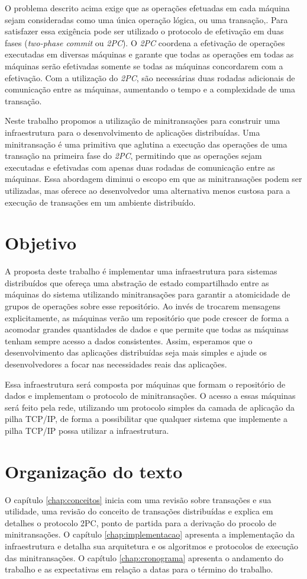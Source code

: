 \documentclass[11pt,twoside,a4paper]{book}
\begin{document}
O problema descrito acima exige que as operações efetuadas em cada máquina sejam consideradas como uma única operação lógica, ou uma transação,. Para satisfazer essa exigência pode ser utilizado o protocolo de efetivação em duas fases (\emph{two-phase commit} ou \emph{2PC}). O \emph{2PC} coordena a efetivação de operações executadas em diversas máquinas e garante que todas as operações em todas as máquinas serão efetivadas somente se todas as máquinas concordarem com a efetivação. Com a utilização do \emph{2PC}, são necessárias duas rodadas adicionais de comunicação entre as máquinas, aumentando o tempo e a complexidade de uma transação.

Neste trabalho propomos a utilização de minitransações para construir uma infraestrutura para o desenvolvimento de aplicações distribuídas. Uma minitransação é uma primitiva que aglutina a execução das operações de uma transação na primeira fase do \emph{2PC}, permitindo que as operações sejam executadas e efetivadas com apenas duas rodadas de comunicação entre as máquinas. Essa abordagem diminui o escopo em que as minitransações podem ser utilizadas, mas oferece ao desenvolvedor uma alternativa menos custosa para a execução de transações em um ambiente distribuído.

\section{Objetivo}
\label{sec:objetivo}
A proposta deste trabalho é implementar uma infraestrutura para sistemas distribuídos que ofereça uma abstração de estado compartilhado entre as máquinas do sistema utilizando minitransações para garantir a atomicidade de grupos de operações sobre esse repositório. Ao invés de trocarem mensagens explicitamente, as máquinas verão um repositório que pode crescer de forma a acomodar grandes quantidades de dados e que permite que todas as máquinas tenham sempre acesso a dados consistentes. Assim, esperamos que o desenvolvimento das aplicações distribuídas seja mais simples e ajude os desenvolvedores a focar nas necessidades reais das aplicações.

Essa infraestrutura será composta por máquinas que formam o repositório de dados e implementam o protocolo de minitransações. O acesso a essas máquinas será feito pela rede, utilizando um protocolo simples da camada de aplicação da pilha TCP/IP, de forma a possibilitar que qualquer sistema que implemente a pilha TCP/IP possa utilizar a infraestrutura.

\section{Organização do texto}
\label{sec:organizacao_do_texto}
O capítulo \ref{chap:conceitos} inicia com uma revisão sobre transações e sua utilidade, uma revisão do conceito de transações distribuídas e explica em detalhes o protocolo 2PC, ponto de partida para a derivação do procolo de minitransações. O capítulo \ref{chap:implementacao} apresenta a implementação da infraestrutura e detalha sua arquitetura e os algoritmos e protocolos de execução das minitransações. O capítulo \ref{chap:cronograma} apresenta o andamento do trabalho e as expectativas em relação a datas para o término do trabalho.
\end{document}
